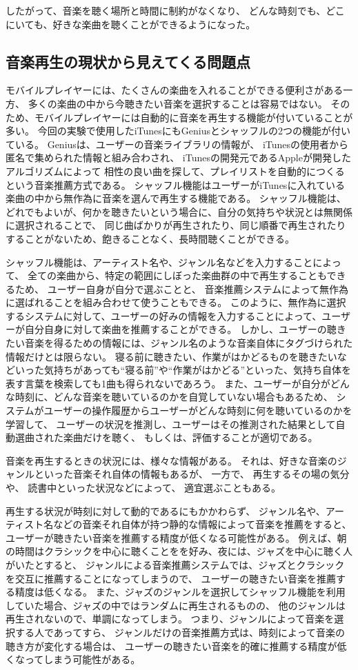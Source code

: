 \documentclass[a4paper, 11pt, onecolumn, report]{jsarticle}
\begin{document}
したがって、音楽を聴く場所と時間に制約がなくなり、
どんな時刻でも、どこにいても、好きな楽曲を聴くことができるようになった。

\subsection{音楽再生の現状から見えてくる問題点}
モバイルプレイヤーには、たくさんの楽曲を入れることができる便利さがある一方、
多くの楽曲の中から今聴きたい音楽を選択することは容易ではない。
そのため、モバイルプレイヤーには自動的に音楽を再生する機能が付いていることが多い。
今回の実験で使用したiTunesにもGeniusとシャッフルの2つの機能が付いている。
Geniusは、ユーザーの音楽ライブラリの情報が、
iTunesの使用者から匿名で集められた情報と組み合わされ、
iTunesの開発元であるAppleが開発したアルゴリズムによって
相性の良い曲を探して、プレイリストを自動的につくるという音楽推薦方式である。
シャッフル機能はユーザーがiTunesに入れている楽曲の中から無作為に音楽を選んで再生する機能である。
シャッフル機能は、どれでもよいが、何かを聴きたいという場合に、自分の気持ちや状況とは無関係に選択されることで、
同じ曲ばかりが再生されたり、同じ順番で再生されたりすることがないため、飽きることなく、長時間聴くことができる。

シャッフル機能は、アーティスト名や、ジャンル名などを入力することによって、
全ての楽曲から、特定の範囲にしぼった楽曲群の中で再生することもできるため、
ユーザー自身が自分で選ぶことと、
音楽推薦システムによって無作為に選ばれることを組み合わせて使うこともできる。
このように、無作為に選択するシステムに対して、ユーザーの好みの情報を入力することによって、ユーザーが自分自身に対して楽曲を推薦することができる。
しかし、ユーザーの聴きたい音楽を得るための情報には、ジャンル名のような音楽自体にタグづけられた情報だけとは限らない。
寝る前に聴きたい、作業がはかどるものを聴きたいなどいった気持ちがあっても``寝る前''や``作業がはかどる''といった、気持ち自体を表す言葉を検索しても1曲も得られないであろう。
また、ユーザーが自分がどんな時刻に、どんな音楽を聴いているのかを自覚していない場合もあるため、
システムがユーザーの操作履歴からユーザーがどんな時刻に何を聴いているのかを学習して、
ユーザーの状況を推測し、ユーザーはその推測された結果として自動選曲された楽曲だけを聴く、
もしくは、評価することが適切である。

音楽を再生するときの状況には、様々な情報がある。
それは、好きな音楽のジャンルといった音楽それ自体の情報もあるが、
一方で、
再生するその場の気分や、
読書中といった状況などによって、
適宜選ぶこともある。

再生する状況が時刻に対して動的であるにもかかわらず、
ジャンル名や、アーティスト名などの音楽それ自体が持つ静的な情報によって音楽を推薦をすると、
ユーザーが聴きたい音楽を推薦する精度が低くなる可能性がある。
例えば、朝の時間はクラシックを中心に聴くことをを好み、夜には、ジャズを中心に聴く人がいたとすると、
ジャンルによる音楽推薦システムでは、ジャズとクラシックを交互に推薦することになってしまうので、
ユーザーの聴きたい音楽を推薦する精度は低くなる。
また、ジャズのジャンルを選択してシャッフル機能を利用していた場合、ジャズの中ではランダムに再生されるものの、
他のジャンルは再生されないので、単調になってしまう。
つまり、ジャンルによって音楽を選択する人であってすら、
ジャンルだけの音楽推薦方式は、時刻によって音楽の聴き方が変化する場合は、
ユーザーの聴きたい音楽を的確に推薦する精度が低くなってしまう可能性がある。
\end{document}
